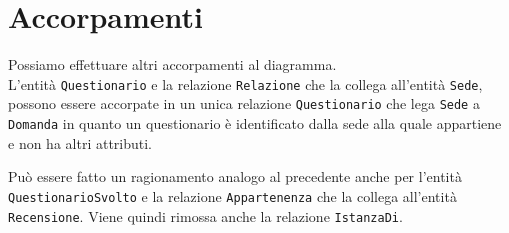 \section{Accorpamenti}
Possiamo effettuare altri accorpamenti al diagramma.\\

L'entità {\tt Questionario} e la relazione {\tt Relazione} che la collega all'entità {\tt Sede},
possono essere accorpate in un unica relazione {\tt Questionario} che lega {\tt Sede}
a {\tt Domanda} in quanto un questionario è identificato dalla sede alla quale appartiene
e non ha altri attributi.

Può essere fatto un ragionamento analogo al precedente anche per l'entità {\tt QuestionarioSvolto}
e la relazione {\tt Appartenenza} che la collega all'entità {\tt Recensione}. Viene
quindi rimossa anche la relazione {\tt IstanzaDi}.
